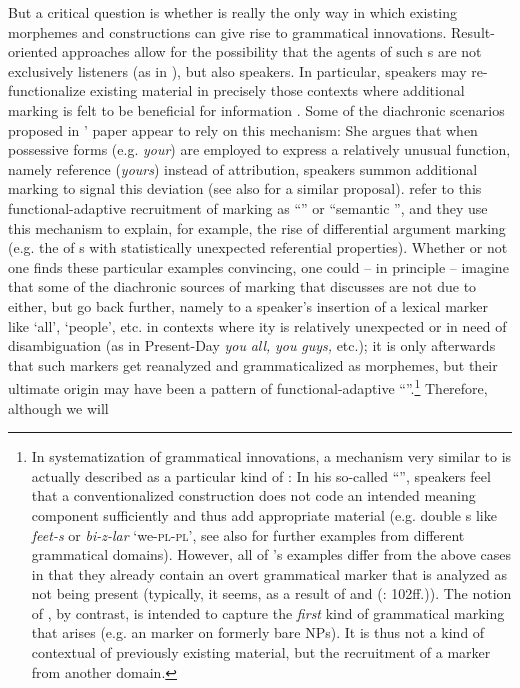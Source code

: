 \documentclass[output=paper]{langsci/langscibook}
\begin{document}
\largerpage
But a critical question is whether  is really the only way in which existing morphemes and constructions can give rise to grammatical innovations. Result-oriented approaches allow for the possibility that the agents of such s are not exclusively listeners (as in ), but also speakers. In particular, speakers may re-functionalize existing material in precisely those contexts where additional marking is felt to be beneficial for information . Some of the diachronic scenarios proposed in ’ paper appear to rely on this mechanism: She argues that when possessive  forms (e.g. \textit{your}) are employed to express a relatively unusual function, namely reference (\textit{yours}) instead of attribution, speakers summon additional marking to signal this deviation (see also \citealt{Croft1991,Croft2001} for a similar proposal). \citet{ZeevatJäger2002} refer to this functional-adaptive recruitment of marking as “” or “semantic ”, and they use this mechanism to explain, for example, the rise of differential argument marking (e.g. the  of s with statistically unexpected referential properties). Whether or not one finds these particular examples convincing, one could – in principle – imagine that some of the diachronic sources of  marking that  discusses are not due to  either, but go back further, namely to a speaker’s insertion of a lexical marker like ‘all’, ‘people’, etc. in contexts where ity is relatively unexpected or in need of disambiguation (as in Present-Day  \textit{you} \textit{all,} \textit{you} \textit{guys,} etc.); it is only afterwards that such markers get reanalyzed and grammaticalized as  morphemes, but their ultimate origin may have been a pattern of functional-adaptive “”.\footnote{In  systematization of grammatical innovations, a mechanism very similar to  is actually described as a particular kind of : In his so-called “”, speakers feel that a conventionalized construction does not code an intended meaning component sufficiently and thus add appropriate material (e.g. double s like  \textit{feet-s} or  \textit{bi-z-lar} ‘we-\textsc{pl}{}-\textsc{pl’}, see also \citealt{Koch1995} for further examples from different grammatical domains). However, all of ’s examples differ from the above cases in that they already contain an overt grammatical marker that is analyzed as not being present (typically, it seems, as a result of  and  (\citealt{Bybee2015}: 102ff.)). The notion of , by contrast, is intended to capture the \textit{first} kind of grammatical marking that arises (e.g. an   marker on formerly bare  NPs). It is thus not a kind of contextual  of previously existing material, but the recruitment of a marker from another domain.} Therefore, although we will 
\end{document}

